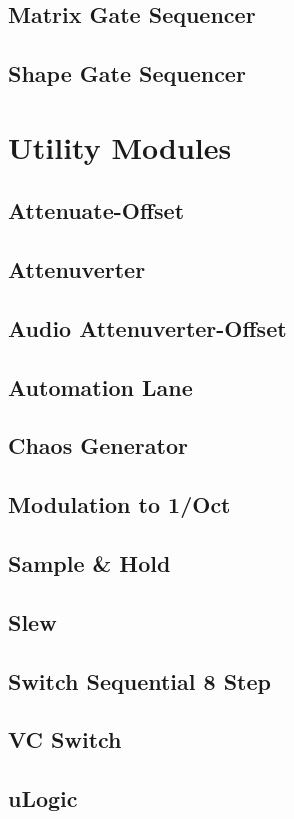 \documentclass[11pt]{book}
\begin{document}
\section{Matrix Gate Sequencer}
\section{Shape Gate Sequencer}

\chapter{Utility Modules}
\section{Attenuate-Offset}
\section{Attenuverter}
\section{Audio Attenuverter-Offset}
\section{Automation Lane}
\section{Chaos Generator}
\section{Modulation to 1/Oct}
\section{Sample \& Hold}
\section{Slew}
\section{Switch Sequential 8 Step}
\section{VC Switch}
\section{uLogic}
\end{document}
